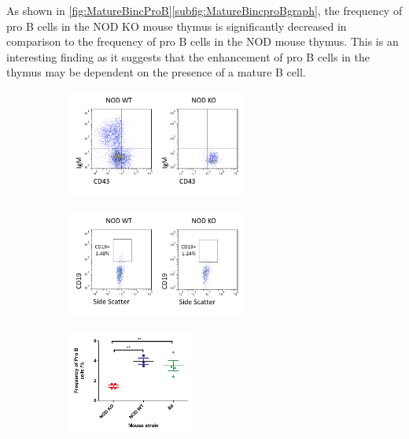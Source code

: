 As shown in \cref{fig:MatureBincProB}\ref{subfig:MatureBincproBgraph}, the frequency of pro B cells in the NOD KO mouse thymus is significantly decreased in comparison to the frequency of pro B cells in the NOD mouse thymus.
This is an interesting finding as it suggests that the enhancement of pro B cells in the thymus may be dependent on the presence of a mature B cell.


\begin{figure}
	\begin{subfigure}{\textwidth}
	\caption{}
	\includegraphics[width=0.65\textwidth]{Figures/NODvKOBM.png}
	\label{subfig:KOBM}
	\end{subfigure}
	\begin{subfigure}{\textwidth}
	\caption{}
	\includegraphics[width=0.65\textwidth]{Figures/NODvKOproBcells.png}
	\label{subfig:ThyProBcells}
	\end{subfigure}
	\begin{subfigure}{\textwidth}
	\caption{}
	\includegraphics[width=0.45\textwidth]{Figures/MatureBincproBgraph.pdf}

\end{subfigure}
\end{figure}
